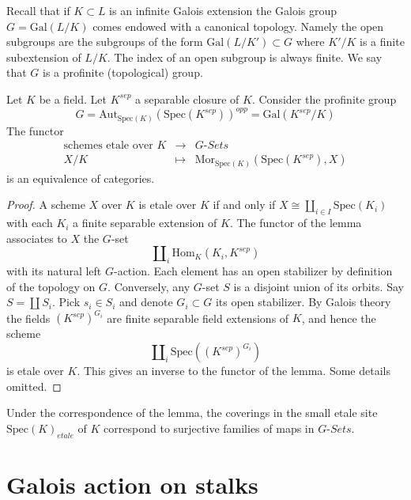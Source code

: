 \medskip\noindent
Recall that if $K \subset L$ is an infinite Galois extension the
Galois group $G = \text{Gal}(L/K)$ comes endowed with a canonical
topology. Namely the open subgroups are the subgroups of the form
$\text{Gal}(L/K') \subset G$ where $K'/K$ is a finite subextension of $L/K$.
The index of an open subgroup is always finite.
We say that $G$ is a profinite (topological) group.

\begin{lemma}
\label{lemma-sheaves-point}
Let $K$ be a field.
Let $K^{sep}$ a separable closure of $K$.
Consider the profinite group
$$
G = \text{Aut}_{\text{Spec}(K)}(\text{Spec}(K^{sep}))^{opp} =
\text{Gal}(K^{sep}/K)
$$
The functor
$$
\begin{matrix}
\text{schemes etale over }K &
\longrightarrow &
G\textit{-Sets} \\
X/K & \longmapsto &
\text{Mor}_{\text{Spec}(K)}(\text{Spec}(K^{sep}), X)
\end{matrix}
$$
is an equivalence of categories.
\end{lemma}

\begin{proof}
A scheme $X$ over $K$ is etale over $K$ if and only if
$X \cong \coprod_{i\in I} \text{Spec}(K_i)$ with
each $K_i$ a finite separable extension of $K$.
The functor of the lemma associates to $X$ the $G$-set
$$
\coprod\nolimits_i \text{Hom}_K(K_i, K^{sep})
$$
with its natural left $G$-action. Each element has an open stabilizer
by definition of the topology on $G$. Conversely, any $G$-set $S$
is a disjoint union of its orbits. Say $S = \coprod S_i$. Pick $s_i \in S_i$
and denote $G_i \subset G$ its open stabilizer. By Galois theory the fields
$(K^{sep})^{G_i}$ are finite separable field extensions of $K$, and
hence the scheme
$$
\coprod\nolimits_i \text{Spec}((K^{sep})^{G_i})
$$
is etale over $K$. This gives an inverse to the functor of the lemma.
Some details omitted.
\end{proof}

\begin{remark}
\label{remark-covering-surjective}
Under the correspondence of the lemma, the coverings in the small etale site
$\text{Spec}(K)_{etale}$ of $K$ correspond to surjective families of maps
in $G\textit{-Sets}$.
\end{remark}







\section{Galois action on stalks}
\label{section-galois-action-stalks}

